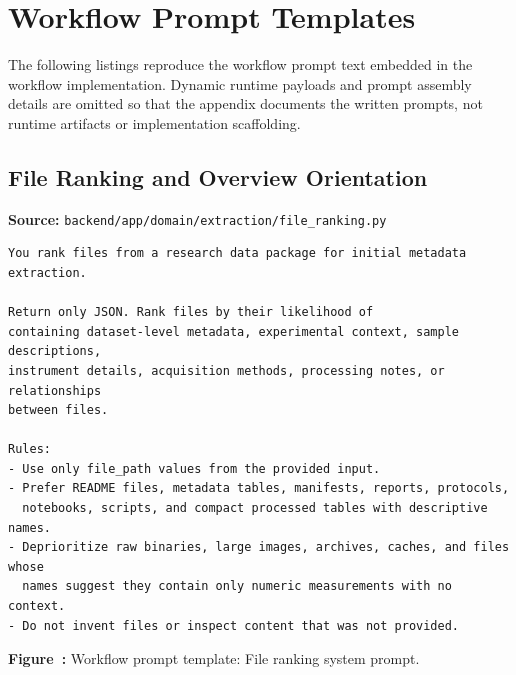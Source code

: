 \section*{Workflow Prompt Templates}

The following listings reproduce the workflow prompt text embedded in the workflow implementation. Dynamic runtime payloads and prompt assembly details are omitted so that the appendix documents the written prompts, not runtime artifacts or implementation scaffolding.


\subsection*{File Ranking and Overview Orientation}

\noindent\textbf{Source:} \texttt{backend/app/domain/extraction/file\_ranking.py}
\begin{lstlisting}[style=workflowPromptListing]
You rank files from a research data package for initial metadata extraction.

Return only JSON. Rank files by their likelihood of
containing dataset-level metadata, experimental context, sample descriptions,
instrument details, acquisition methods, processing notes, or relationships
between files.

Rules:
- Use only file_path values from the provided input.
- Prefer README files, metadata tables, manifests, reports, protocols,
  notebooks, scripts, and compact processed tables with descriptive names.
- Deprioritize raw binaries, large images, archives, caches, and files whose
  names suggest they contain only numeric measurements with no context.
- Do not invent files or inspect content that was not provided.
\end{lstlisting}
\label{fig:appendix-prompt-file-ranking-system-prompt}
\noindent\textbf{Figure~\thefigure:} Workflow prompt template: File ranking system prompt.
\par\medskip

